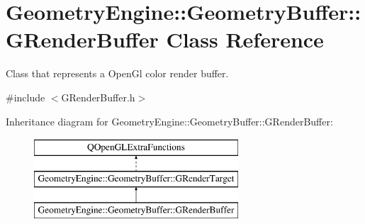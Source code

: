 \hypertarget{class_geometry_engine_1_1_geometry_buffer_1_1_g_render_buffer}{}\section{Geometry\+Engine\+::Geometry\+Buffer\+::G\+Render\+Buffer Class Reference}
\label{class_geometry_engine_1_1_geometry_buffer_1_1_g_render_buffer}


Class that represents a Open\+Gl color render buffer.  




{\ttfamily \#include $<$G\+Render\+Buffer.\+h$>$}

Inheritance diagram for Geometry\+Engine\+::Geometry\+Buffer\+::G\+Render\+Buffer\+:\begin{figure}[H]
\begin{center}
\leavevmode
\includegraphics[height=3.000000cm]{class_geometry_engine_1_1_geometry_buffer_1_1_g_render_buffer}
\end{center}
\end{figure}
